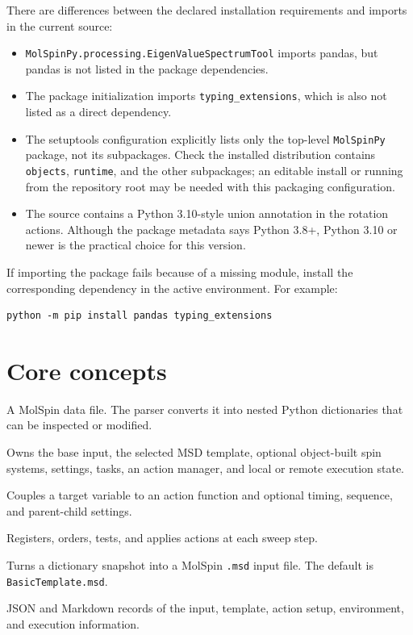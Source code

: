 \documentclass[11pt,a4paper]{article}
\begin{document}
There are differences between the declared installation requirements and
imports in the current source:
\begin{itemize}[nosep]
  \item \texttt{MolSpinPy.processing.EigenValueSpectrumTool} imports pandas,
        but pandas is not listed in the package dependencies.
  \item The package initialization imports \texttt{typing\_extensions}, which
        is also not listed as a direct dependency.
  \item The setuptools configuration explicitly lists only the top-level
        \texttt{MolSpinPy} package, not its subpackages. Check the installed
        distribution contains \texttt{objects}, \texttt{runtime}, and the
        other subpackages; an editable install or running from the repository
        root may be needed with this packaging configuration.
  \item The source contains a Python 3.10-style union annotation in the
        rotation actions. Although the package metadata says Python 3.8+,
        Python 3.10 or newer is the practical choice for this version.
\end{itemize}
If importing the package fails because of a missing module, install the
corresponding dependency in the active environment. For example:

\begin{lstlisting}
python -m pip install pandas typing_extensions
\end{lstlisting}

\section{Core concepts}

\begin{description}[style=nextline]
  \item[MSD input] A MolSpin data file. The parser converts it into nested
        Python dictionaries that can be inspected or modified.
  \item[Project] Owns the base input, the selected MSD template, optional
        object-built spin systems, settings, tasks, an action manager, and
        local or remote execution state.
  \item[Action] Couples a target variable to an action function and optional
        timing, sequence, and parent-child settings.
  \item[ActionManager] Registers, orders, tests, and applies actions at each
        sweep step.
  \item[Template] Turns a dictionary snapshot into a MolSpin \texttt{.msd}
        input file. The default is \texttt{BasicTemplate.msd}.
  \item[Project metadata] JSON and Markdown records of the input, template,
        action setup, environment, and execution information.
\end{description}
\end{document}
